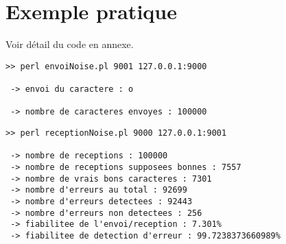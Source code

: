     \section{Exemple pratique}
           \lstset{
                language=bash, basicstyle=\ttfamily\small, columns=flexible,
                tabsize=2, extendedchars=true, showspaces=false,
                showstringspaces=false, numbers=left, numberstyle=\tiny,
                breaklines=true, breakautoindent=true, captionpos=b
            }
Voir détail du code en annexe.
    \begin{lstlisting}
>> perl envoiNoise.pl 9001 127.0.0.1:9000

 -> envoi du caractere : o

 -> nombre de caracteres envoyes : 100000

    \end{lstlisting}

    \begin{lstlisting}
>> perl receptionNoise.pl 9000 127.0.0.1:9001

 -> nombre de receptions : 100000
 -> nombre de receptions supposees bonnes : 7557
 -> nombre de vrais bons caracteres : 7301
 -> nombre d'erreurs au total : 92699
 -> nombre d'erreurs detectees : 92443
 -> nombre d'erreurs non detectees : 256
 -> fiabilitee de l'envoi/reception : 7.301%
 -> fiabilitee de detection d'erreur : 99.7238373660989%

    \end{lstlisting}
